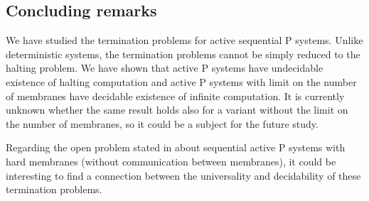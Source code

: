 
\subsection{Concluding remarks} %
\label{sub:concluding_remarks}

We have studied the termination problems for active sequential P systems. Unlike deterministic systems, the termination problems cannot be simply reduced to the halting problem. We have shown that active P systems have undecidable existence of halting computation and active P systems with limit on the number of membranes have decidable existence of infinite computation. It is currently unknown whether the same result holds also for a variant without the limit on the number of membranes, so it could be a subject for the future study.

Regarding the open problem stated in \cite{Ibarra05Active} about sequential active P systems with hard membranes (without communication between membranes), it could be interesting to find a connection between the universality and decidability of these termination problems.

